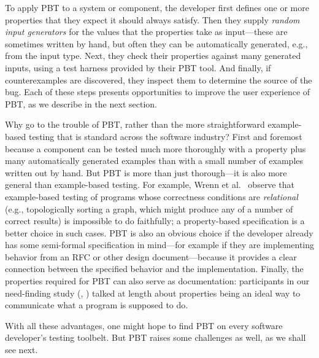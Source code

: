 To apply PBT to a system or component, the developer first defines one
or more properties that they expect it should always satisfy. Then
they supply {\em random input generators} for the values that the
properties take as input---these are sometimes written by hand, but
often they can be automatically generated, e.g., from the input
type. Next, they check their properties against many generated inputs,
using a test harness provided by their PBT tool. And finally, if
counterexamples are discovered, they inspect them to determine the
source of the bug.  Each of these steps presents opportunities\iflater{}\fi{} to
improve the user experience of PBT, as we describe in the next
section.

\smallskip

Why go to the trouble of PBT, rather than the more straightforward
example-based testing that is standard across the software industry?
First and foremost because a component can be tested much more
thoroughly with a property plus many automatically generated examples
than with a small number of examples written out by hand.
But
PBT is more than just thorough---it is also more general than example-based
testing. For example, Wrenn et al.~\cite{wrenn2021using} observe that example-based testing
of programs whose correctness conditions are {\em relational} (e.g.,
topologically sorting a graph, which might
produce any of a number of correct results) is impossible to do
faithfully; a property-based specification is a better choice in
such cases.
PBT is also
an obvious choice if
the developer already has some semi-formal
specification in mind---for example if they are implementing behavior from an RFC or
other design document---because it provides a clear connection between the
specified behavior and the implementation.
Finally, the
properties required for PBT can also serve as documentation:
participants in our need-finding study (, )
talked at length about properties being an ideal way to communicate what a
program is supposed to do.

\iflater{}\fi

With all these advantages, one might hope to find PBT on every
software developer's testing toolbelt.  But PBT raises some challenges
as well, as we shall see next.

